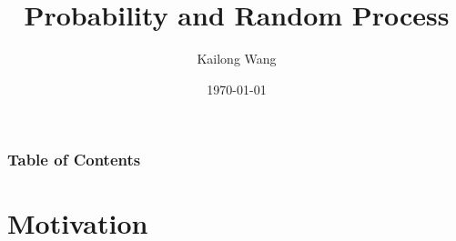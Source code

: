 \documentclass[10pt]{../formats/RU}
\title[ECE 226 Probability]{Probability and Random Process}
\author[Kai] %
{Kailong Wang\inst{1}
}
\institute[Rutgers] %
{
  \inst{1}%
  Faculty of ECE\\
  Rutgers University
}
\date[\today] %
{\today}
\begin{document}
\frame{\titlepage}
\begin{frame}
\frametitle{Table of Contents}
\tableofcontents
\end{frame}


\section{Motivation}
\end{document}
